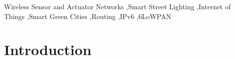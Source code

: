 \documentclass[authoryear,preprint,review,12pt]{elsarticle}
\begin{document}
\begin{frontmatter}

%




\begin{keyword}
Wireless Sensor and Actuator Networks  \sep Smart Street Lighting \sep Internet of Things \sep Smart Green Cities \sep Routing \sep IPv6 \sep 6LoWPAN 



\end{keyword}

\end{frontmatter}


\section{Introduction}
\end{document}
